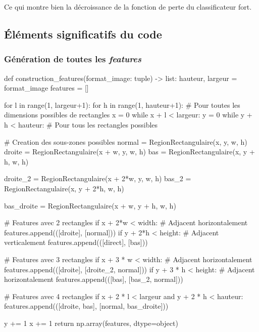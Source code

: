 \documentclass[12pt,a4paper]{article}
\begin{document}
Ce qui montre bien la décroissance de la fonction de perte du classificateur fort.

\subsection{Éléments significatifs du code}
\subsubsection{Génération de toutes les \textit{features}}
\label{sec:construction-features}

\begin{python}
def construction_features(format_image: tuple) -> list:
    hauteur, largeur = format_image
    features = []

    for l in range(1, largeur+1):
        for h in range(1, hauteur+1):
            # Pour toutes les dimensions possibles de rectangles
            x = 0
            while x + l < largeur:
                y = 0
                while y + h < hauteur:
                    # Pour tous les rectangles possibles
                    
                    # Creation des sous-zones possibles
                    normal = RegionRectangulaire(x, y, w, h)
                    droite = RegionRectangulaire(x + w, y, w, h)
                    bas = RegionRectangulaire(x, y + h, w, h)

                    droite_2 = RegionRectangulaire(x + 2*w, y, w, h)
                    bas_2 = RegionRectangulaire(x, y + 2*h, w, h)

                    bas_droite = RegionRectangulaire(x + w, y + h, w, h)

                    # Features avec 2 rectangles
                    if x + 2*w < width: # Adjacent horizontalement
                        features.append(([droite], [normal]))
                    if y + 2*h < height: # Adjacent verticalement
                        features.append(([direct], [bas]))

                    # Features avec 3 rectangles
                    if x + 3 * w < width: # Adjacent horizontalement
                        features.append(([droite], [droite_2, normal]))
                    if y + 3 * h < height: # Adjacent horizontalement
                        features.append(([bas], [bas_2, normal]))

                    # Features avec 4 rectangles
                    if x + 2 * l < largeur and y + 2 * h < hauteur:
                        features.append(([droite, bas], [normal, bas_droite]))

                    y += 1
                x += 1
    return np.array(features, dtype=object)
\end{python}
\end{document}
